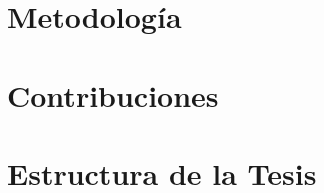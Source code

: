 \section{Metodología} %
\label{sec:Metodología}


\section{Contribuciones} %
\label{sec:Contribuciones}

\section{Estructura de la Tesis} %
\label{sec:Estructura de la Tesis}